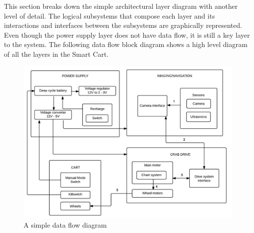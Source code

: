 This section breaks down the simple architectural layer diagram with another level of detail. The logical subsystems that compose each layer and its interactions and interfaces between the subsystems are graphically represented. Even though the power supply layer does not have data flow, it is still a key layer to the system. The following data flow block diagram shows a high level diagram of all the layers in the Smart Cart.

\begin{figure}[h!]
	\centering
 	\includegraphics[width=\textwidth]{images/diagram_whole}
 \caption{A simple data flow diagram}
\end{figure}
